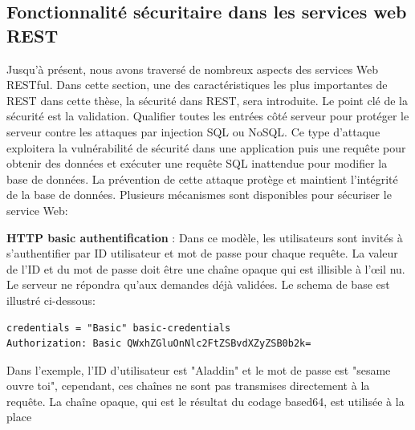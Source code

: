 \subsection{Fonctionnalité sécuritaire dans les services web REST}
Jusqu'à présent, nous avons traversé de nombreux aspects des services Web RESTful. Dans cette section, une des caractéristiques les plus importantes de REST dans cette thèse, la sécurité dans REST, sera introduite. Le point clé de la sécurité est la validation. Qualifier toutes les entrées côté serveur pour protéger le serveur contre les attaques par injection SQL ou NoSQL. Ce type d'attaque exploitera la vulnérabilité de sécurité dans une application puis une requête pour obtenir des données et exécuter une requête SQL inattendue pour modifier la base de données. La prévention de cette attaque protège et maintient l'intégrité de la base de données.
Plusieurs mécanismes sont disponibles pour sécuriser le service Web:

\textbf{HTTP basic authentification} : Dans ce modèle, les utilisateurs sont invités à s'authentifier par ID utilisateur et mot de passe pour chaque requête. La valeur de l'ID et du mot de passe doit être une chaîne opaque qui est illisible à l'œil nu. Le serveur ne répondra qu'aux demandes déjà validées. Le schema de base est illustré ci-dessous:
\begin{verbatim}
credentials = "Basic" basic-credentials 
Authorization: Basic QWxhZGluOnNlc2FtZSBvdXZyZSB0b2k=
\end{verbatim}
Dans l'exemple, l'ID d'utilisateur est "Aladdin" et le mot de passe est "sesame ouvre toi", cependant, ces chaînes ne sont pas transmises directement à la requête. La chaîne opaque, qui est le résultat du codage based64, est utilisée à la place \cite{16}

